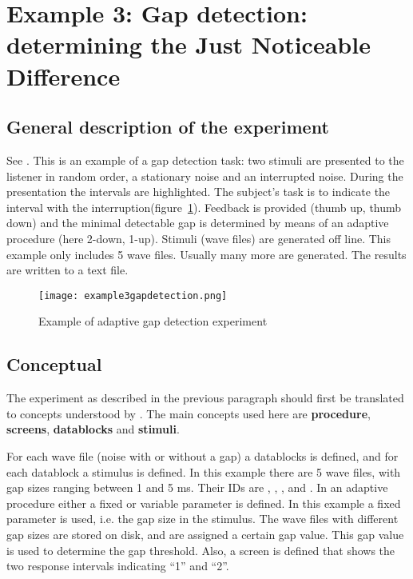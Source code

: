 \newpage
\section{Example 3: Gap detection: determining the Just Noticeable Difference}


\subsection{General description of the experiment}
See . This is an
example of a gap detection task: two stimuli are presented to the
listener in random order, a stationary noise and an interrupted
noise. During the presentation the intervals are highlighted. The
subject's task is to indicate the interval with the
interruption(figure~\ref{fig:gapdetection}). Feedback is provided
(thumb up, thumb down) and the minimal detectable gap is
determined by means of an adaptive procedure (here 2-down, 1-up).
Stimuli (wave files) are generated off line. This example only
includes 5 wave files. Usually many more are generated. The
results are written to a text file.


\begin{figure}
 \centering
\texttt{[image: example3gapdetection.png]}
 \caption{Example of adaptive gap detection experiment}
 \label{fig:gapdetection}
\end{figure}

\subsection{Conceptual}
The experiment as described in the previous paragraph should first
be translated to concepts understood by \apex. The main concepts
used here are \textbf{procedure}, \textbf{screens},
\textbf{datablocks} and \textbf{stimuli}.

For each wave file (noise with or without a gap) a \element
{datablocks} is defined, and for each datablock a \element
{stimulus} is defined. In this example there are 5 wave files,
with gap sizes ranging between 1 and 5 ms. Their IDs are
, , , and . In an
adaptive procedure either a fixed or variable parameter is
defined. In this example a fixed parameter is used, i.e. the gap
size in the stimulus. The wave files with different gap sizes are
stored on disk, and are assigned a certain gap value. This gap
value is used to determine the gap threshold. Also, a \element
{screen} is defined that shows the two response intervals
indicating ``1'' and ``2''.

